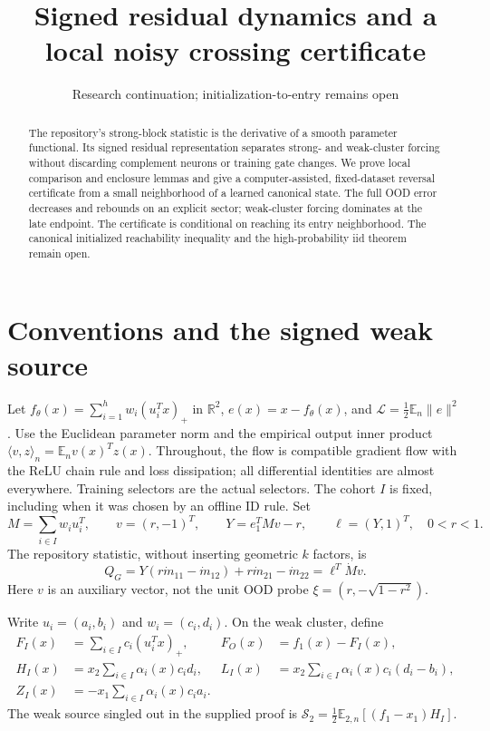 \documentclass[10pt]{article}
\title{Signed residual dynamics and a local noisy crossing certificate}
\author{Research continuation; initialization-to-entry remains open}
\date{}
\newcommand{\E}{\mathbb E}
\newcommand{\R}{\mathbb R}
\newcommand{\ip}[2]{\langle #1,#2\rangle_n}
\begin{document}
\maketitle
\begin{abstract}
The repository's strong-block statistic is the derivative of a smooth
parameter functional. Its signed residual representation separates strong-
and weak-cluster forcing without discarding complement neurons or training
gate changes. We prove local comparison and enclosure lemmas and give a
computer-assisted, fixed-dataset reversal certificate from a small
neighborhood of a learned canonical state. The full OOD error decreases
and rebounds on an explicit sector; weak-cluster forcing dominates at the
late endpoint. The certificate is conditional on reaching its entry
neighborhood. The canonical initialized reachability inequality and the
high-probability iid theorem remain open.
\end{abstract}

\section{Conventions and the signed weak source}
Let $f_\theta(x)=\sum_{i=1}^h w_i(u_i^Tx)_+$ in $\R^2$,
$e(x)=x-f_\theta(x)$, and $\mathcal L=\frac12\E_n\|e\|^2$.
Use the Euclidean parameter norm and the empirical output inner product
$\ip{v}{z}=\E_n v(x)^Tz(x)$. Throughout, the flow is compatible gradient
flow with the ReLU chain rule and loss dissipation; all differential identities
are almost everywhere. Training selectors are the actual selectors.
The cohort $I$ is fixed, including when it was chosen by an offline ID rule.
Set
\[
 M=\sum_{i\in I}w_i u_i^T,\qquad v=(r,-1)^T,\qquad
 Y=e_1^TMv-r,\qquad \ell=(Y,1)^T,\quad 0<r<1.
\]
The repository statistic, without inserting geometric $k$ factors, is
\begin{equation}\label{eq:q}
 Q_G=Y(r\dot m_{11}-\dot m_{12})+r\dot m_{21}-\dot m_{22}
     =\ell^T\dot Mv.
\end{equation}
Here $v$ is an auxiliary vector, not the unit OOD probe
$\xi=(r,-\sqrt{1-r^2})$.

Write $u_i=(a_i,b_i)$ and $w_i=(c_i,d_i)$. On the weak cluster, define
\begin{align*}
 F_I(x)&=\sum_{i\in I}c_i(u_i^Tx)_+,& F_O(x)&=f_1(x)-F_I(x),\\
 H_I(x)&=x_2\sum_{i\in I}\alpha_i(x)c_id_i,
 &L_I(x)&=x_2\sum_{i\in I}\alpha_i(x)c_i(d_i-b_i),\\
 Z_I(x)&=-x_1\sum_{i\in I}\alpha_i(x)c_ia_i.
\end{align*}
The weak source singled out in the supplied proof is
$\mathcal S_2=\frac12\E_{2,n}[(f_1-x_1)H_I]$.
\end{document}
